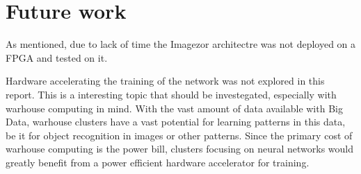 \chapter{Future work}

As mentioned, due to lack of time the Imagezor architectre was not deployed on a FPGA and tested on it. 

Hardware accelerating the training of the network was not explored in this report. This is a interesting topic that should be investegated, especially with warhouse computing in mind. With the vast amount of data available with Big Data, warhouse clusters have a vast potential for learning patterns in this data, be it for object recognition in images or other patterns. Since the primary cost of warhouse computing is the power bill, clusters focusing on neural networks would greatly benefit from a power efficient hardware accelerator for training. 